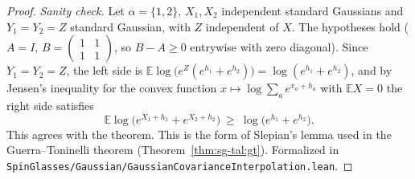 \begin{proof}
\emph{Sanity check.} Let $\alpha=\{1,2\}$, $X_1,X_2$ independent standard Gaussians and $Y_1=Y_2=Z$ standard Gaussian, with $Z$ independent of $X$. The hypotheses hold ($A=I$, $B=\left(\begin{smallmatrix}1&1\\1&1\end{smallmatrix}\right)$, so $B-A\ge0$ entrywise with zero diagonal). Since $Y_1=Y_2=Z$, the left side is $\mathbb{E}\log\big(e^{Z}(e^{h_1}+e^{h_2})\big)=\log(e^{h_1}+e^{h_2})$, and by Jensen's inequality for the convex function $x\mapsto\log\sum_ae^{x_a+h_a}$ with $\mathbb{E}X=0$ the right side satisfies
\[
\mathbb{E}\log\big(e^{X_1+h_1}+e^{X_2+h_2}\big)\ \ge\ \log\big(e^{h_1}+e^{h_2}\big).
\]
This agrees with the theorem.
This is the form of Slepian's lemma used in the Guerra--Toninelli theorem (Theorem~\ref{thm:sg-tal:gt}).
Formalized in \texttt{SpinGlasses/Gaussian/GaussianCovarianceInterpolation.lean}.
\end{proof}

